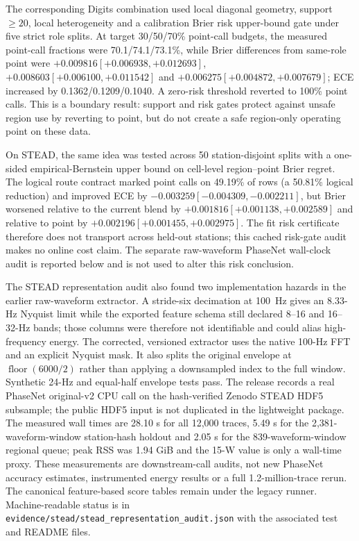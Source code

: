 \documentclass[11pt,a4paper]{article}
\numberwithin{equation}{section}
\theoremstyle{definition}\newtheorem{definition}[theorem]{Definition}
\theoremstyle{remark}\newtheorem{remark}[theorem]{Remark}
\begin{document}
The corresponding Digits combination used local diagonal geometry, support $\ge20$, local heterogeneity and a calibration Brier risk upper-bound gate under five strict role splits. At target 30/50/70\% point-call budgets, the measured point-call fractions were 70.1/74.1/73.1\%, while Brier differences from same-role point were $+0.009816[+0.006938,+0.012693]$, $+0.008603[+0.006100,+0.011542]$ and $+0.006275[+0.004872,+0.007679]$; ECE increased by 0.1362/0.1209/0.1040. A zero-risk threshold reverted to 100\% point calls. This is a boundary result: support and risk gates protect against unsafe region use by reverting to point, but do not create a safe region-only operating point on these data.

On STEAD, the same idea was tested across 50 station-disjoint splits with a one-sided empirical-Bernstein upper bound on cell-level region--point Brier regret. The logical route contract marked point calls on 49.19\% of rows (a 50.81\% logical reduction) and improved ECE by $-0.003259[-0.004309,-0.002211]$, but Brier worsened relative to the current blend by $+0.001816[+0.001138,+0.002589]$ and relative to point by $+0.002196[+0.001455,+0.002975]$. The fit risk certificate therefore does not transport across held-out stations; this cached risk-gate audit makes no online cost claim. The separate raw-waveform PhaseNet wall-clock audit is reported below and is not used to alter this risk conclusion.

The STEAD representation audit also found two implementation hazards in the earlier raw-waveform extractor. A stride-six decimation at 100~Hz gives an 8.33-Hz Nyquist limit while the exported feature schema still declared 8--16 and 16--32-Hz bands; those columns were therefore not identifiable and could alias high-frequency energy. The corrected, versioned extractor uses the native 100-Hz FFT and an explicit Nyquist mask. It also splits the original envelope at $\operatorname{floor}(6000/2)$ rather than applying a downsampled index to the full window. Synthetic 24-Hz and equal-half envelope tests pass. The release records a real PhaseNet original-v2 CPU call on the hash-verified Zenodo STEAD HDF5 subsample; the public HDF5 input is not duplicated in the lightweight package. The measured wall times are 28.10 s for all 12,000 traces, 5.49 s for the 2,381-waveform-window station-hash holdout and 2.05 s for the 839-waveform-window regional queue; peak RSS was 1.94 GiB and the 15-W value is only a wall-time proxy. These measurements are downstream-call audits, not new PhaseNet accuracy estimates, instrumented energy results or a full 1.2-million-trace rerun. The canonical feature-based score tables remain under the legacy runner. Machine-readable status is in \texttt{evidence/stead/stead\_representation\_audit.json} with the associated test and README files.
\end{document}

